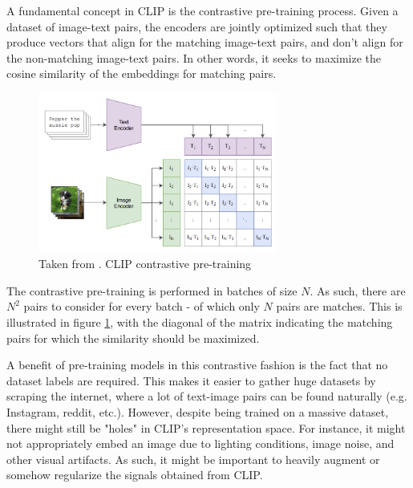 A fundamental concept in CLIP is the contrastive pre-training process. Given a dataset of image-text pairs, the encoders are jointly optimized such that they produce vectors that align for the matching image-text pairs, and don't align for the non-matching image-text pairs. In other words, it seeks to maximize the cosine similarity of the embeddings for matching pairs.

\begin{figure}[H]
    \centering
    \includegraphics[width=0.7\textwidth]{figures/clip-contrast.png}
    \caption{Taken from \cite{radford2021}. CLIP contrastive pre-training}
    \label{fig:clip-contrast}
\end{figure}

The contrastive pre-training is performed in batches of size $N$. As such, there are $N^2$ pairs to consider for every batch - of which only $N$ pairs are matches. This is illustrated in figure \ref{fig:clip-contrast}, with the diagonal of the matrix indicating the matching pairs for which the similarity should be maximized.

A benefit of pre-training models in this contrastive fashion is the fact that no dataset labels are required. This makes it easier to gather huge datasets by scraping the internet, where a lot of text-image pairs can be found naturally (e.g. Instagram, reddit, etc.). However, despite being trained on a massive dataset, there might still be "holes" in CLIP's representation space. For instance, it might not appropriately embed an image due to lighting conditions, image noise, and other visual artifacts. As such, it might be important to heavily augment or somehow regularize the signals obtained from CLIP.

